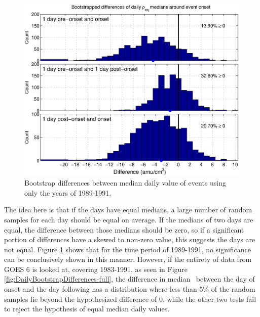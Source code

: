 \begin{figure}[htp!]
	\centering
	\includegraphics[width=1\linewidth]{Figures/DailyBootstrapDifferences-GOES6-case10}
	\caption{Bootstrap differences between median daily value of events using only the years of 1989-1991.}
	\label{fig:DailyBootstrapDifferences}
\end{figure}


The idea here is that if the days have equal medians, a large number of random samples for each day should be equal on average. If the medians of two days are equal, the difference between those medians should be zero, so if a significant portion of differences have a skewed to non-zero value, this suggests the days are not equal. Figure \ref{fig:DailyBootstrapDifferences} shows that for the time period of 1989-1991, no significance can be conclusively shown in this manner. However, if the entirety of data from GOES 6 is looked at, covering 1983-1991, as seen in Figure \ref{fig:DailyBootstrapDifferences-full}, the difference in median \req\ between the day of onset and the day following has a distribution where less than 5\% of the random samples lie beyond the hypothesized difference of 0, while the other two tests fail to reject the hypothesis of equal median daily values.  


